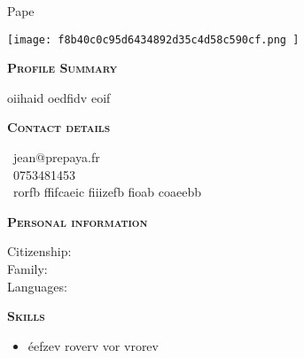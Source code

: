 \documentclass[11pt,a4paper]{article}
\newcommand{\headleft}[1]{\vspace*{3ex}\textsc{\textbf{#1}}\par%
    \vspace*{-1.5ex}\hrulefill\par\vspace*{0.7ex}}
\begin{document}
\setlength{\topskip}{0pt}\setlength{\parindent}{0pt}\setlength{\parskip}{0pt}
\setlength{\fboxsep}{0pt}\pagestyle{empty}\raggedbottom

\begin{minipage}[t]{0.33\textwidth}
\colorbox{cvblue}{\begin{minipage}[t][5mm][t]{\textwidth}\null\hfill\null\end{minipage}}
\vspace{-.2ex}
\colorbox{cvblue!90}{\color{white}
\textwidth
\begin{minipage}[t][293mm][t]{0.82\textwidth}\raggedright
\vspace*{2.5ex}

\Large Pape \textbf{\textscFALL} \normalsize


\null\hfill\texttt{[image:  f8b40c0c95d6434892d35c4d58c590cf.png ]}\hfill\null


\vspace*{0.5ex}

\headleft{Profile Summary}
oiihaid oedfidv eoif

\headleft{Contact details}\small
\MVAt\ {\small jean@prepaya.fr} \\[0.4ex]
\Mobilefone\ 0753481453 \\[0.5ex]
\Letter\ rorfb ffifcaeic fiiizefb fioab  coaeebb
\normalsize

\headleft{Personal information}
Citizenship: \textbfsenegalaise \\[0.5ex]
Family:  \\[0.5ex]
Languages: 

\headleft{Skills}
\begin{itemize}

  \item éefzev roverv vor vrorev

\end{itemize}

\end{minipage}\textwidth
}
\end{minipage}
\end{document}
